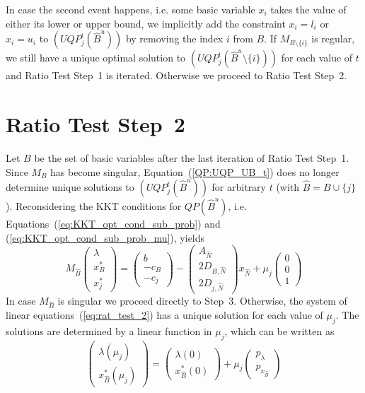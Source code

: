 \documentclass[a4paper]{article}
\begin{document}
In case the second event happens, i.e. some basic variable $x_{i}$ takes the
value of either its lower or upper bound, we implicitly add the constraint
$x_{i}=l_{i}$ or $x_{i}=u_{i}$ to $(UQP_{j}^{t}(\hat{B}^{u}))$ by removing the
index $i$ from $B$. If $M_{B\setminus \{i\}}$ is regular, we still have a unique
optimal solution to $(UQP_{j}^{t}(\hat{B}^{u} \setminus\{i\}))$ for each value
of $t$ and Ratio Test Step~1 is iterated.
Otherwise we proceed to Ratio Test Step~2.

\section{Ratio Test Step~2}
Let $B$ be the set of basic variables after the last iteration of Ratio Test
Step~1. Since $M_{B}$ has become singular, Equation~(\ref{QP:UQP_UB_t}) does no
longer determine unique solutions to $(UQP_{j}^{t}(\hat{B}^{u}))$ for arbitrary
$t$ (with $\hat{B}=B \cup \{j\}$). Reconsidering the KKT conditions for
$QP(\hat{B}^{u})$, i.e. Equations~(\ref{eq:KKT_opt_cond_sub_prob}) and
(\ref{eq:KKT_opt_cond_sub_prob_mu}), yields
\begin{equation}
\label{eq:rat_test_2}
M_{\hat{B}}
\left(
\begin{array}{c}
\lambda \\
\hline
x_{B}^{*} \\
\hline
x_{j}^{*}
\end{array}
\right)
=
\left(
\begin{array}{c}
b \\
\hline
-c_{B} \\
\hline
-c_{j}
\end{array}
\right)
-
\left(
\begin{array}{c}
A_{\hat{N}} \\
\hline
2D_{B, \hat{N}} \\
\hline
2D_{j, \hat{N}}
\end{array}
\right)
x_{\hat{N}}
+\mu_{j}
\left(
\begin{array}{c}
0 \\
\hline
0 \\
\hline
1
\end{array}
\right)
\end{equation}
In case $M_{\hat{B}}$ is singular we proceed directly to Step~3. Otherwise, the
system of linear equations~(\ref{eq:rat_test_2}) has a unique solution for each
value of $\mu_{j}$. The solutions are determined by a linear function in 
$\mu_{j}$, which can be written as
\begin{equation}
\label{eq:x_hat_B_mu_j}
\left(
\begin{array}{c}
\lambda(\mu_{j}) \\
\hline
x_{\hat{B}}^{*}(\mu_{j})
\end{array}
\right)
=
\left(
\begin{array}{c}
\lambda(0) \\
\hline
x_{\hat{B}}^{*}(0)
\end{array}
\right)
+\mu_{j}
\left(
\begin{array}{c}
p_{\lambda} \\
\hline
p_{x_{\hat{B}}}
\end{array}
\right)
\end{equation}
\end{document}
